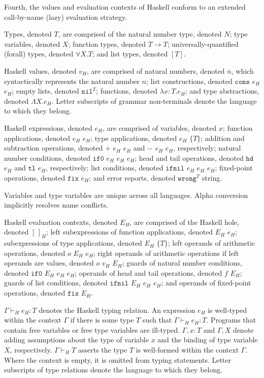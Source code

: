 Fourth, the values and evaluation contexts of Haskell conform to an extended call-by-name (lazy) evaluation strategy.

Types, denoted $T$, are comprised of the natural number type, denoted $N$; type variables, denoted $X$; function types, denoted $T\rightarrow T$; universally-quantified (forall) types, denoted $\forall X.T$; and list types, denoted $[T]$.

Haskell values, denoted $v_{H}$, are comprised of natural numbers, denoted $\overline{n}$, which syntactically represents the natural number $n$; list constructions, denoted $\mathtt{cons}$ $e_{H}$ $e_{H}$; empty lists, denoted $\mathtt{nil}^{T}$; functions, denoted $\lambda x:T.e_{H}$; and type abstractions, denoted $\Lambda X.e_{H}$.  Letter subscripts of grammar non-terminals denote the language to which they belong.

Haskell expressions, denoted $e_{H}$, are comprised of variables, denoted $x$; function applications, denoted $e_{H}$ $e_{H}$; type applications, denoted $e_{H}$ $\lbrace T\rbrace$; addition and subtraction operations, denoted $+$ $e_{H}$ $e_{H}$ and $-$ $e_{H}$ $e_{H}$, respectively; natural number conditions, denoted $\mathtt{if0}$ $e_{H}$ $e_{H}$ $e_{H}$; head and tail operations, denoted $\mathtt{hd}$ $e_{H}$ and $\mathtt{tl}$ $e_{H}$, respectively; list conditions, denoted $\mathtt{ifnil}$ $e_{H}$ $e_{H}$ $e_{H}$; fixed-point operations, denoted $\mathtt{fix}$ $e_{H}$; and error reports, denoted $\mathtt{wrong}^{T}$ string.

Variables and type variables are unique across all languages.  Alpha conversion implicitly resolves name conflicts.

Haskell evaluation contexts, denoted $E_{H}$, are comprised of the Haskell hole, denoted $[\,]_{H}$; left subexpressions of function applications, denoted $E_{H}$ $e_{H}$; subexpressions of type applications, denoted $E_{H}$ $\lbrace T\rbrace$; left operands of arithmetic operations, denoted $o$ $E_{H}$ $e_{H}$; right operands of arithmetic operations if left operands are values, denoted $o$ $v_{H}$ $E_{H}$; guards of natural number conditions, denoted $\mathtt{if0}$ $E_{H}$ $e_{H}$ $e_{H}$; operands of head and tail operations, denoted $f$ $E_{H}$; guards of list conditions, denoted $\mathtt{ifnil}$ $E_{H}$ $e_{H}$ $e_{H}$; and operands of fixed-point operations, denoted $\mathtt{fix}$ $E_{H}$.

$\Gamma\vdash_{H}e_{H}:T$ denotes the Haskell typing relation.  An expression $e_{H}$ is well-typed within the context $\Gamma$ if there is some type $T$ such that $\Gamma\vdash_{H}e_{H}:T$.  Programs that contain free variables or free type variables are ill-typed.  $\Gamma,x:T$ and $\Gamma,X$ denote adding assumptions about the type of variable $x$ and the binding of type variable $X$, respectively.  $\Gamma\vdash_{H}T$ asserts the type $T$ is well-formed within the context $\Gamma$.  Where the context is empty, it is omitted from typing statements.  Letter subscripts of type relations denote the language to which they belong.

